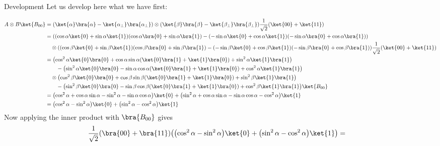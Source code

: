 	\begin{parag}{Development}
	    Let us develop here what we have first:
	\end{parag}
		\begin{align*} 
			A \otimes B \ket{B_{00}}  &= \left(\ket{\alpha}\bra{\alpha} - \ket{\alpha_\perp}\bra{\alpha_\perp}\right) \otimes \left(\ket{\beta}\bra{\beta} - \ket{\beta_\perp}\bra{\beta_\perp}\right) \frac{1}{\sqrt{2}}\left(\ket{00} + \ket{11}\right)\\
									  &= \left(\left( \cos \alpha \ket{0} + \sin \alpha \ket{1}\right)\left(\cos \alpha \bra{0} + \sin \alpha \bra{1}\right) - \left(-\sin \alpha \ket{0} + \cos \alpha \ket{1}\right)\left(-\sin \alpha \bra{0} + \cos \alpha \bra{1}\right)\right) \\
									  &\mathspace \otimes \left(\left( \cos \beta \ket{0} + \sin \beta \ket{1}\right)\left(\cos \beta \bra{0} + \sin \beta \bra{1}\right) - \left(-\sin \beta \ket{0} + \cos \beta \ket{1}\right)\left(-\sin \beta \bra{0} + \cos \beta \bra{1}\right)\right) \frac{1}{\sqrt{2}}\left(\ket{00} + \ket{11}\right)\\
									  &= \left(\cos^2 \alpha \ket{0}\bra{0} + \cos \alpha \sin \alpha \left(\ket{0}\bra{1} + \ket{1}\bra{0}\right) + \sin^2 \alpha \ket{1}\bra{1}\right)\\
									  &\mathspace \mathspace - \left(\sin^2 \alpha \ket{0}\bra{0} - \sin \alpha \cos \alpha \left(\ket{0}\bra{1} + \ket{1}\bra{0}\right) + \cos^2 \alpha \ket{1}\bra{1}\right)\\
									  &\mathspace \otimes   \left(\cos^2 \beta \ket{0}\bra{0} + \cos \beta \sin \beta \left(\ket{0}\bra{1} + \ket{1}\bra{0}\right) + \sin^2 \beta \ket{1}\bra{1}\right)\\
									  &\mathspace \mathspace - \left(\sin^2 \beta \ket{0}\bra{0} - \sin \beta \cos \beta \left(\ket{0}\bra{1} + \ket{1}\bra{0}\right) + \cos^2 \beta \ket{1}\bra{1}\right)\ket{B_{00}}\\
									  &= \left(\cos^2 \alpha + \cos \alpha \sin \alpha - \sin^2 \alpha - \sin \alpha \cos \alpha\right)\ket{0} + \left(\sin^2 \alpha + \cos \alpha \sin \alpha -\sin \alpha \cos \alpha - \cos^2 \alpha\right)\ket{1}\\
									  &= \left(\cos^2 \alpha - \sin^2 \alpha\right)\ket{0} + \left(\sin^2 \alpha - \cos^2 \alpha\right)\ket{1}
		\end{align*}
		Now applying the inner product with $\bra{B_{00}}$ gives 
		\begin{align*} 
			\frac{1}{\sqrt{2}} \left(\bra{00} + \bra{11}\right)\left(\left(\cos^2 \alpha - \sin^2 \alpha\right)\ket{0} + \left(\sin^2 \alpha - \cos^2 \alpha\right)\ket{1}\right) &= 
		\end{align*}

